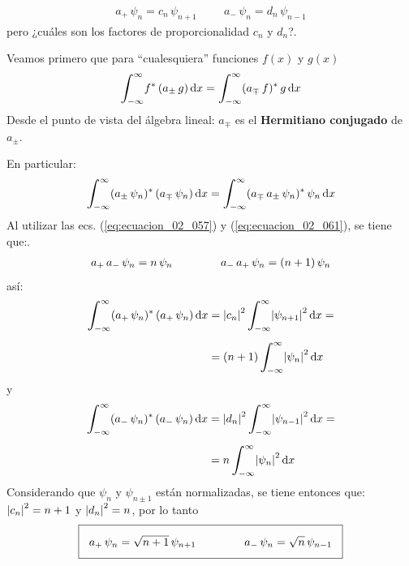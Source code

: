 \documentclass[12pt]{article}
\def\scaleint#1{\vcenter{\hbox{\scaleto[3ex]{\displaystyle\int}{#1}}}}
\def\bs{\mkern-12mu}
\numberwithin{equation}{section}
\begin{document}
\begin{align}
a_{+} \, \psi_{n} = c_{n} \, \psi_{n+1} \hspace{1cm} a_{-} \, \psi_{n} = d_{n} \, \psi_{n-1}
\label{eq:ecuacion_02_063}
\end{align}
pero ¿cuáles son los factores de proporcionalidad $c_{n}$ y $d_{n}$?.
\par
Veamos primero que para \enquote{cualesquiera} funciones $f(x)$ y $g(x)$
\begin{align}
\scaleint{6ex}_{\bs -\infty}^{\infty} f^{*} \, (a_{\pm} \, g) \dd{x} = \scaleint{6ex}_{\bs -\infty}^{\infty} (a_{\mp} \, f)^{*} \, g \dd{x}
\label{eq:ecuacion_02_064}
\end{align}
Desde el punto de vista del álgebra lineal: $a_{\mp}$ es el \textbf{Hermitiano conjugado} de $a_{\pm}$.
\par
En particular:
\begin{align*}
\scaleint{6ex}_{\bs -\infty}^{\infty} (a_{\pm} \, \psi_{n})^{*} \, (a_{\mp} \, \psi_{n}) \dd{x} = \scaleint{6ex}_{\bs -\infty}^{\infty} (a_{\mp} \, a_{\pm} \, \psi_{n})^{*} \, \psi_{n} \dd{x}
\end{align*}
Al utilizar las ecs. (\ref{eq:ecuacion_02_057}) y (\ref{eq:ecuacion_02_061}), se tiene que:.
\begin{align}
a_{+} \, a_{-} \, \psi_{n} = n \, \psi_{n} \hspace{1.5cm} a_{-} \, a_{+} \, \psi_{n} = (n + 1) \, \psi_{n}
\label{eq:ecuacion_02_065}
\end{align}
así:
\begin{align*}
\scaleint{6ex}_{\bs -\infty}^{\infty} (a_{+} \, \psi_{n})^{*} \, (a_{+} \, \psi_{n}) \dd{x} &= \abs{c_{n}}^{2} \, \scaleint{6ex}_{\bs -\infty}^{\infty} \abs{\psi_{n+1}}^{2} \dd{x} = \\[0.5em]
&= (n + 1) \, \scaleint{6ex}_{\bs -\infty}^{\infty} \abs{\psi_{n}}^{2} \dd{x} 
\end{align*}
y
\begin{align*}
\scaleint{6ex}_{\bs -\infty}^{\infty} (a_{-} \, \psi_{n})^{*} \, (a_{-} \, \psi_{n}) \dd{x} &= \abs{d_{n}}^{2} \, \scaleint{6ex}_{\bs -\infty}^{\infty} \abs{\psi_{n-1}}^{2} \dd{x} = \\[0.5em]
&= n \, \scaleint{6ex}_{\bs -\infty}^{\infty} \abs{\psi_{n}}^{2} \dd{x} 
\end{align*}
Considerando que $\psi_{n}$ y $\psi_{n \pm 1}$ están normalizadas, se tiene entonces que: $\abs{c_{n}}^{2} = n + 1$ y $\abs{d_{n}}^{2} = n$, por lo tanto
\begin{align}
\setlength{\fboxsep}{3\fboxsep}\boxed{
a_{+} \, \psi_{n} = \sqrt{n + 1} \, \psi_{n+1} \hspace{1.5cm} a_{-} \, \psi_{n} = \sqrt{n} \, \psi_{n-1}
}
\label{eq:ecuacion_02_066}
\end{align}
\end{document}
